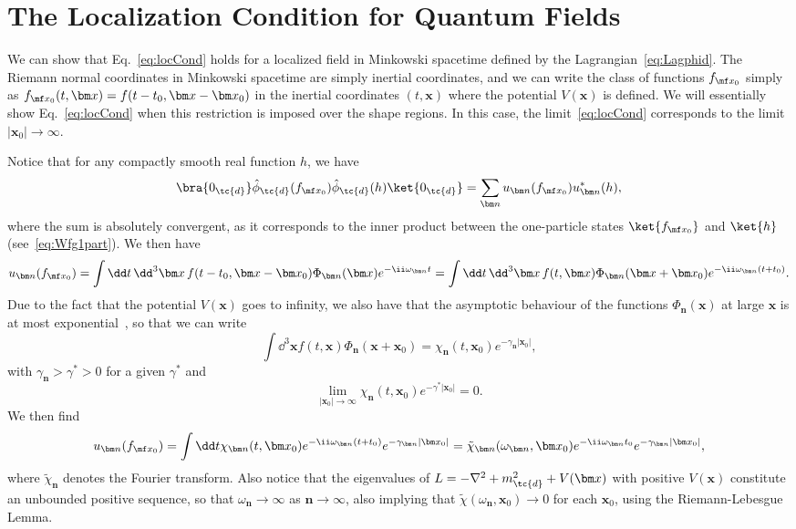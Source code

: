 \chapter{The Localization Condition for Quantum Fields}\label{app:locCond}

We can show that  Eq.~\eqref{eq:locCond} holds for a localized field in Minkowski spacetime defined by the Lagrangian~\eqref{eq:Lagphid}. The Riemann normal coordinates in Minkowski spacetime are simply inertial coordinates, and we can write the class of functions ${f}_{\mf x_0}$ simply as $f_{\mf x_0}(t,\bm x) = f(t-t_0,\bm x-\bm x_0)$ in the inertial coordinates $(t,\bm x)$ where the potential $V(\bm x)$ is defined. We will essentially show Eq.~\eqref{eq:locCond} when this restriction is imposed over the shape regions. In this case, the limit~\eqref{eq:locCond} corresponds to the limit $|\bm x_0|\to \infty$. 

Notice that for any compactly smooth real function $h$, we have
\begin{equation}\label{eq:auxlocCond}
    \bra{0_\tc{d}}\hat{\phi}_\tc{d}(f_{\mf x_0})\hat{\phi}_\tc{d}(h)\ket{0_\tc{d}} = \sum_{\bm n} u_{\bm n}({f}_{\mf x_0})u_{\bm n}^*(h),
\end{equation}
where the sum is absolutely convergent, as it corresponds to the inner product between the one-particle states $\ket{f_{\mf x_0}}$ and $\ket{h}$ (see~\eqref{eq:Wfg1part}).  We then have
\begin{equation}
    u_{\bm n}(f_{\mf x_0}) = \int \dd t \,\dd^3 \bm x \, f(t-t_0,\bm x - \bm x_0) \Phi_{\bm n}(\bm x) e^{-\ii \omega_{\bm n} t} = \int \dd t \,\dd^3 \bm x \, f(t,\bm x) \Phi_{\bm n}(\bm x + \bm x_0) e^{-\ii \omega_{\bm n} (t+t_0)}. 
\end{equation}
Due to the fact that the potential $V(\bm x)$ goes to infinity, we also have that the asymptotic behaviour of the functions $\Phi_{\bm n}(\bm x)$ at large $\bm x$ is at most exponential~\cite{expDecay}, so that we can write
 \begin{equation}
     \int \dd^3 \bm x f(t,\bm x) \Phi_{\bm n}(\bm x + \bm x_0) = \chi_{\bm n}(t,\bm x_0) e^{-\gamma_{\bm n}|\bm x_0|}, 
 \end{equation}
 with $\gamma_{\bm n}> \gamma^*>0$ for a given $\gamma^*$ and
 \begin{equation}
     \lim_{|\bm x_0| \to \infty}\chi_{\bm n}(t,\bm x_0) e^{-\gamma^*|\bm x_0|} = 0.
 \end{equation}
 We then find
\begin{equation}
    u_{\bm n}(f_{\mf x_0}) = \int \dd t \chi_{\bm n}(t, \bm x_0)e^{-\ii \omega_{\bm n} (t+t_0)}e^{-\gamma_{\bm n}|\bm x_0|} = \tilde{\chi}_{\bm n}(\omega_{\bm n},\bm x_0)e^{-\ii \omega_{\bm n} t_0}e^{-\gamma_{\bm n}|\bm x_0|},
\end{equation}
where $\tilde{\chi}_{\bm n}$ denotes the Fourier transform. Also notice that the eigenvalues of $L = - \nabla^2 + m_\tc{d}^2 + V(\bm x)$ with positive $V(\bm x)$ constitute an unbounded positive sequence, so that $\omega_{\bm n}\to \infty$ as $\bm n \to \infty$, also implying that $\tilde{\chi}(\omega_{\bm n},\bm x_0)\to 0$ for each $\bm x_0$, using the Riemann-Lebesgue Lemma.

